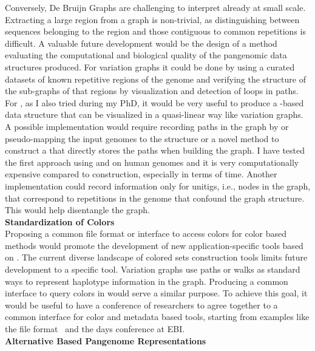 Conversely, De Bruijn Graphs are challenging to interpret already at small scale. Extracting a large region from a graph is non-trivial, as distinguishing between sequences belonging to the region and those contiguous to common repetitions is difficult.
A valuable future development would be the design of a method evaluating the computational and biological quality of the pangenomic data structures produced. For variation graphs it could be done by using a curated datasets of known repetitive regions of the genome and verifying the structure of the sub-graphs of that regions by visualization and detection of loops in paths. For \dbgs, as I also tried during my PhD, it would be very useful to produce a \dbg-based data structure that can be visualized in a quasi-linear way like variation graphs. A possible implementation would require recording paths in the graph by or pseudo-mapping the input genomes to the \ccdbg structure or a novel method to construct a \cdbg that directly stores the paths when building the graph. I have tested the first approach using \ggcat and \ssh on human genomes and it is very computationally expensive compared to \ccdbg construction, especially in terms of time. Another implementation could record information only for unitigs, i.e., nodes in the graph, that correspond to repetitions in the genome that confound the graph structure. This would help disentangle the graph.\\
\textbf{Standardization of \dbg Colors}\\
Proposing a common file format or interface to access colors for color \dbg based methods would promote the development of new application-specific tools based on \kmers. The current diverse landscape of colored \kmer sets construction tools limits future development to a specific tool. Variation graphs use paths or walks as standard ways to represent haplotype information in the graph. Producing a common interface to query colors in \dbgs would serve a similar purpose. To achieve this goal, it would be useful to have a conference of \kmer researchers to agree together to a common interface for color and metadata based tools, starting from examples like the \kmer file format~\cite{kff} and the \kmer days conference at EBI.\\
\textbf{Alternative \kmer Based Pangenome Representations}\\
